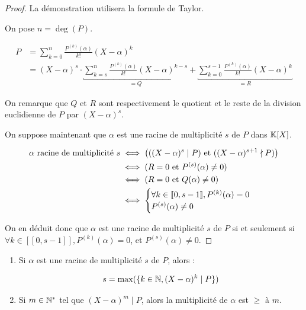 \documentclass[12pt, a4paper]{report}
\begin{document}
\begin{proof}
    La démonstration utilisera la formule de Taylor.

    On pose $n = \deg(P)$.

    \begin{align*}
        P &= \sum_{k=0}^{n} \frac{P^{(k)}(\alpha)}{k!} (X-\alpha)^k\\
        &= (X-\alpha)^s \cdot \underbracket{\sum_{k=s}^{n} \frac{P^{(k)}(\alpha)}{k!} (X-\alpha)^{k-s}}_{=Q} + \underbracket{\sum_{k=0}^{s-1} \frac{P^{(k)}(\alpha)}{k!} (X-\alpha)^k}_{=R}
    \end{align*}

    On remarque que $Q$ et $R$ sont respectivement le quotient et le reste de la division euclidienne de $P$ par $(X-\alpha)^s$.

    On suppose maintenant que $\alpha$ est une racine de multiplicité $s$ de $P$ dans $\mathbb{K}[X]$.

    \begin{align*}
        \alpha \text{ racine de multiplicité } s &\iff \big(((X-\alpha)^s \mid P) \text{ et } ((X-\alpha)^{s+1} \nmid P)\big)\\
        &\iff (R=0 \text{ et } P^{(s)}(\alpha) \ne 0)\\
        &\iff (R=0 \text{ et } Q(\alpha) \ne 0)\\
        &\iff \begin{cases}
        \forall k \in [\![0,s-1]\!], P^{(k)}(\alpha) = 0\\
        P^{(s)}(\alpha) \ne 0
        \end{cases}
    \end{align*}

    On en déduit donc que $\alpha$ est une racine de multiplicité $s$ de $P$ si et seulement si $\forall k \in [\![0,s-1]\!], P^{(k)}(\alpha) = 0$, et $P^{(s)}(\alpha) \ne 0$.
\end{proof}

\begin{remark}
    \begin{enumerate}
        \item Si $\alpha$ est une racine de multiplicité $s$ de $P$, alors :
        
        $$s = \max(\{k \in \mathbb{N}, (X-\alpha)^k \mid P\})$$

        \item Si $m \in \mathbb{N}^*$ tel que $(X-\alpha)^m \mid P$, alors la multiplicité de $\alpha$ est $\ge$ à $m$.
    \end{enumerate}
\end{remark}
\end{document}
